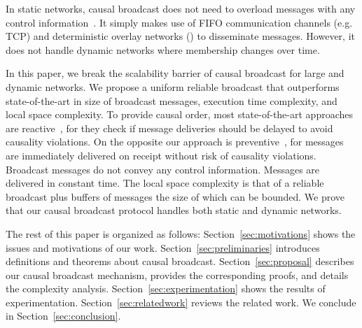 In static networks, causal broadcast does not need to overload messages with any
control information~\cite{friedman2004causal}. It simply makes use of FIFO
communication channels (e.g. TCP) and deterministic overlay networks (\REF) to
disseminate messages. However, it does not handle dynamic networks where
membership changes over time.

In this paper, we break the scalability barrier of causal broadcast for large
and dynamic networks. We propose a uniform reliable broadcast that outperforms
state-of-the-art in size of broadcast messages, execution time complexity, and
local space complexity.
To provide causal order, most state-of-the-art approaches are
reactive~\cite{almeida2008interval,fidge1988timestamps,hadzilacos1993fault,mattern1989virtual,mostefaoui2017probabilistic,singhal1992efficient},
for they check if message deliveries should be delayed to avoid causality
violations. On the opposite our approach is
preventive~\cite{birman1987reliable,friedman2004causal}, for messages are
immediately delivered on receipt without risk of causality violations. Broadcast
messages do not convey any control information. Messages are delivered in
constant time. The local space complexity is that of a reliable broadcast plus
buffers of messages the size of which can be bounded.  We prove that our causal
broadcast protocol handles both static and dynamic networks.


The rest of this paper is organized as follows: Section~\ref{sec:motivations}
shows the issues and motivations of our work. Section~\ref{sec:preliminaries}
introduces definitions and theorems about causal
broadcast. Section~\ref{sec:proposal} describes our causal broadcast mechanism,
provides the corresponding proofs, and details the complexity
analysis. Section~\ref{sec:experimentation} shows the results of
experimentation.  Section~\ref{sec:relatedwork} reviews the related work. We
conclude in Section~\ref{sec:conclusion}.




